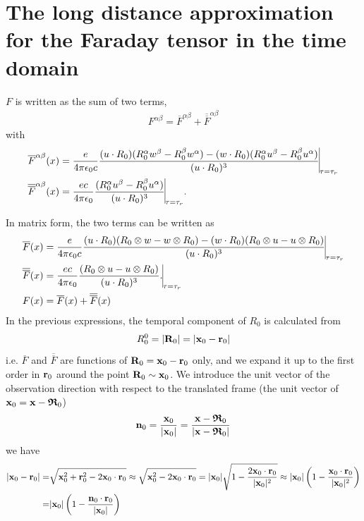 \section{The long distance approximation for the Faraday tensor in the time domain}

$F$ is written as the sum of two terms,
\begin{align}
    F^{\alpha\beta}=\overline{F}^{\alpha\beta}+\overline{\overline{F}}^{\alpha\beta}
\end{align}
with
\begin{align}
     & \overline F^{\alpha\beta}(x)={\frac{e}{4\pi\epsilon_0c}\frac{(u\cdot R_0)(R_0^{\alpha}w^{\beta}-R_0^{\beta}w^{\alpha})-(w\cdot R_0)(R_0^{\alpha}u^{\beta}-R_0^{\beta}u^{\alpha})}{(u\cdot R_0)^3}\vline}_{\tau=\tau_r} \\
     & \overline{\overline F}^{\alpha\beta}(x)={\frac{ec}{4\pi\epsilon_0}\frac{(R_0^{\alpha}u^{\beta}-R_0^{\beta}u^{\alpha})}{(u\cdot R_0)^3}\vline}_{\tau=\tau_r}.\label{def-F-short}
\end{align}

In matrix form, the two terms can be written as
\begin{align}
     & \overline{F}(x)={\frac{e}{4\pi\epsilon_0c}\frac{(u\cdot R_0)(R_0\otimes w-w\otimes R_0)-(w\cdot R_0)(R_0\otimes u- u \otimes R_0)}{(u\cdot R_0)^3}\vline}_{\tau=\tau_r} \\
     & \overline{\overline F}(x)={\frac{ec}{4\pi\epsilon_0}\frac{(R_0\otimes u- u \otimes R_0)}{(u\cdot R_0)^3}.\vline}_{\tau=\tau_r}                                                  \\
     & F(x)=\overline F(x) + \overline{\overline F}(x)
\end{align}
In the previous expressions, the temporal component of $R_0$ is calculated from
\begin{align}
    R_0^0 = |{\bf R}_0| = |{\bf x}_0-{\bf r}_0|
\end{align}
i.e. $\overline F$ and $\overline{\overline F}$ are functions of ${\bf R}_0={\bf x}_0-{\bf r}_0$ only, and we expand it up to the first order in ${\bf r}_0$ around the point ${\bf R}_0\sim{\bf x}_0$.
We introduce the unit vector of the observation direction with respect to the translated frame (the unit vector of ${\bf x}_0 = {\bf x}-{\boldsymbol{\mathfrak R}}_0$)
\begin{align}
    {\bf n}_0=\frac{{\bf x}_0}{|{\bf x}_0|}=\frac{{\bf x}-{\boldsymbol{\mathfrak R}}_0}{|{\bf x}-{\boldsymbol{\mathfrak R}}_0|}
\end{align}
we have
\begin{align}
    |{\bf x}_0-{\bf r}_0| = & \sqrt{{\bf x}_0^2 +{\bf r}_0^2 -2{\bf x}_0\cdot{\bf r}_0}\approx\sqrt{{\bf x}_0^2  -2{\bf x}_0\cdot{\bf r}_0}=|{\bf x}_0|\sqrt{1-\frac{2{\bf x}_0\cdot{\bf r}_0}{|{\bf x}_0|^2}}\approx|{\bf x}_0|\left(1-\frac{{\bf x}_0\cdot{\bf r}_0}{|{\bf x}_0|^2}\right)\nonumber \\
    =                       & |{\bf x}_0|\left(1-\frac{{\bf n}_0\cdot{\bf r}_0}{|{\bf x}_0|}\right)
\end{align}

